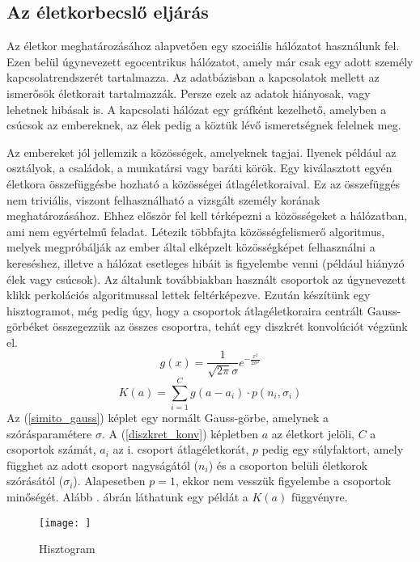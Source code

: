 \documentclass[12pt]{article}
\begin{document}

\subsection{Az életkorbecslő eljárás} %
Az életkor meghatározásához alapvetően egy szociális hálózatot használunk fel. Ezen belül úgynevezett egocentrikus hálózatot, amely már csak egy adott személy kapcsolatrendszerét tartalmazza. Az adatbázisban a kapcsolatok mellett az ismerősök életkorait tartalmazzák. Persze ezek az adatok hiányosak, vagy lehetnek hibásak is. A kapcsolati hálózat egy gráfként kezelhető, amelyben a csúcsok az embereknek, az élek pedig a köztük lévő ismeretségnek felelnek meg.

Az embereket jól jellemzik a közösségek, amelyeknek tagjai. Ilyenek például az osztályok, a családok, a munkatársi vagy baráti körök. Egy kiválasztott egyén életkora összefüggésbe hozható a közösségei átlagéletkoraival. Ez az összefüggés nem triviális, viszont felhasználható a vizsgált személy korának meghatározásához. Ehhez először fel kell térképezni a közösségeket a hálózatban, ami nem egyértelmű feladat. Létezik \iffalse TODO: létezik helyett valami más szó \fi többfajta közösségfelismerő algoritmus, melyek megpróbálják az ember által elképzelt közösségképet felhasználni a kereséshez, illetve a hálózat esetleges hibáit is figyelembe venni (például hiányzó élek vagy csúcsok). Az általunk továbbiakban használt csoportok az úgynevezett klikk perkolációs algoritmussal \cite{tamas_gabor_tdk} lettek feltérképezve. %
Ezután készítünk egy hisztogramot, még pedig úgy, hogy a csoportok átlagéletkoraira centrált Gauss-görbéket összegezzük az összes csoportra, tehát egy diszkrét konvolúciót végzünk el.
\begin{equation} \label{simito_gauss}
	g(x) = \frac{1}{\sqrt{2\pi}\sigma}e^{-\frac{x^2}{2\sigma^2}}
\end{equation}
\begin{equation} \label{diszkret_konv}
	K(a) = \sum_{i=1}^{C} g(a-a_i) \cdot p(n_{i}, \sigma_{i}) %
\end{equation}
Az \iffalse TODO: Az-A \fi (\ref{simito_gauss}) képlet egy normált Gauss-görbe, amelynek a szórásparamétere $\sigma$. A \iffalse Az-A \fi (\ref{diszkret_konv}) képletben $a$ az életkort jelöli, $C$ a csoportok számát, $a_i$ az i. csoport átlagéletkorát, $p$ pedig egy súlyfaktort, amely függhet az adott csoport nagyságától ($n_{i}$) és a csoporton belüli életkorok szórásától ($\sigma_i$). Alapesetben $p=1$, ekkor nem vesszük figyelembe a csoportok minőségét\iffalse TODO: milyenségét \fi. Alább . ábrán láthatunk egy példát a $K(a)$ függvényre.
\begin{figure}[H]
	\centering
	\texttt{[image: ]}
	\caption{Hisztogram} %
	\label{hisztogram_pelda}
\end{figure}
\end{document}
